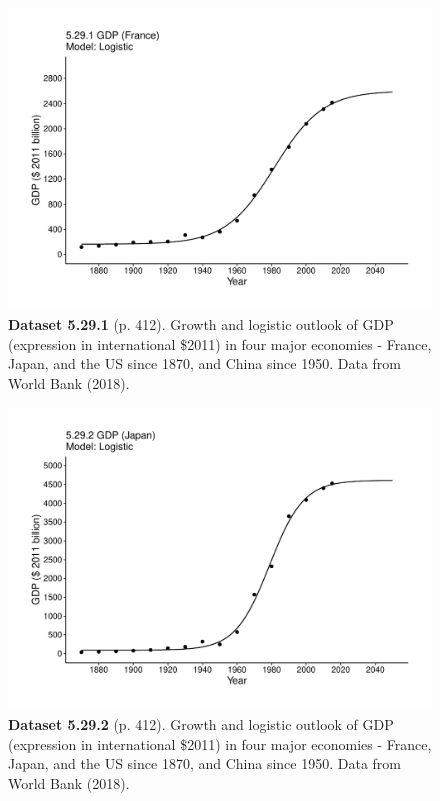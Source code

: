 \documentclass[aps,rmp,preprint,superscriptaddress,10pt,onecolumn]{article}
\begin{document}
\clearpage
\begin{figure}[h]
\includegraphics[width=\textwidth]{output/figs-ggplot/5.29.1.pdf}
\caption*{\textbf{Dataset 5.29.1} (p. 412). Growth and logistic outlook of GDP (expression in international \$2011) in four major economies - France, Japan, and the US since 1870, and China since 1950. Data from World Bank (2018).}
\end{figure}
	
\clearpage
\begin{figure}[h]
\includegraphics[width=\textwidth]{output/figs-ggplot/5.29.2.pdf}
\caption*{\textbf{Dataset 5.29.2} (p. 412). Growth and logistic outlook of GDP (expression in international \$2011) in four major economies - France, Japan, and the US since 1870, and China since 1950. Data from World Bank (2018).}
\end{figure}
	
\end{document}
